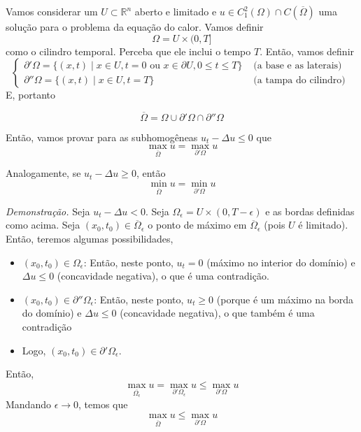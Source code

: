 \documentclass[11pt]{article}
\newcommand{\Rn}{{\mathbb{R}^n}}
\newcommand{\p}{\partial}
\newcommand{\e}{\epsilon}
\newcommand{\mi}{\text{-}}
\begin{document}
Vamos considerar um \(U\subset \Rn\) aberto e limitado e \(u \in C^2_1 (\Omega) \cap C(\overline{\Omega})\) uma solução para o problema da equação do calor. Vamos definir \[\Omega = U \times (0, T]\] como o cilindro temporal. Perceba que ele inclui o tempo \(T\). Então, vamos definir \[\begin{cases}
	\partial'\Omega = \{ (x,t)\mid x \in U, t=0 \text{ ou } x \in \p U, 0\leq t \leq T \} & \text{ (a base e as laterais) }\\
	\partial''\Omega = \{ (x,t)\mid x \in U, t = T\} & \text{ (a tampa do cilindro) }
\end{cases}\] E, portanto 
\begin{figure}
\end{figure}
 \[\overline{\Omega} = \Omega \cup \p'\Omega \cap \p''\Omega\]



Então, vamos provar para as subhomogêneas \(u_t - \Delta u \leq0\) que \[\max_{\overline{\Omega}} u = \max_{\p'\Omega} u \]

Analogamente, se \(u_t - \Delta u \geq 0 \), então \[\min_{\overline{\Omega}} u = \min_{\p'\Omega} u \]


\textit{Demonstração.} Seja \(u_t - \Delta u < 0 \). Seja \(\Omega_\e = U \times (0, T-\e)\) e as bordas definidas como acima. Seja \((x_0, t_0) \in \overline{\Omega}_\e\) o ponto de máximo em \(\overline{\Omega}_\e\) (pois \(U\) é limitado). Então, teremos algumas possibilidades,	 \begin{itemize}
	\item \((x_0,t_0) \in \Omega_\e\): Então, neste ponto, \(u_t=0\) (máximo no interior do domínio) e \(\Delta u \leq 0\) (concavidade negativa), o que é uma contradição.
	\item \((x_0,t_0) \in \p''\Omega_\e\): Então, neste ponto, \(u_t\geq 0\) (porque é um máximo na borda do domínio) e \(\Delta u \leq 0\) (concavidade negativa), o que também é uma contradição
	\item Logo, \((x_0,t_0) \in \p'\Omega_\e\).	
\end{itemize}
Então, \[ \max_{\overline{\Omega_\e}} u = \max_{\p'\Omega_\e} u \leq  \max_{\p'\Omega} u\]
Mandando \(\e \rightarrow 0 \), temos que \[ \max_{\overline{\Omega}} u \leq \max_{\p'\Omega} u\]
\end{document}
